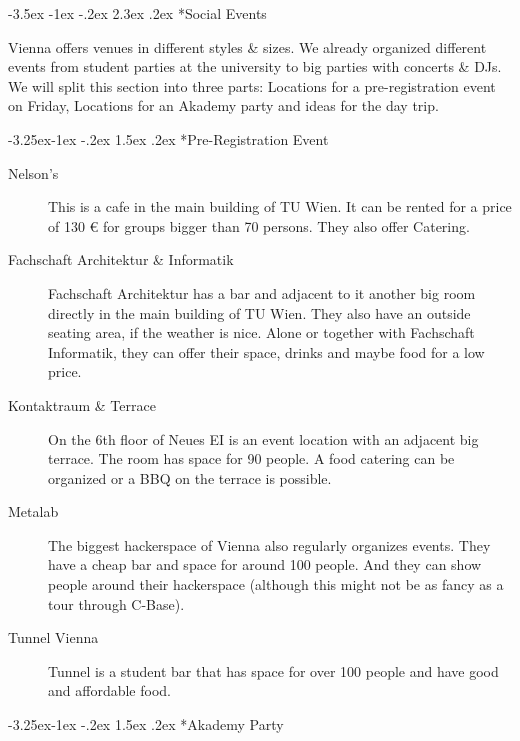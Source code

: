 \documentclass[10pt,a4paper]{article}
\makeatletter
\renewcommand\section{%
\@startsection{section}{1}{\z@}%
              {-3.5ex \@plus -1ex \@minus -.2ex}%
              {2.3ex \@plus.2ex}%
              {\color{kdelight}\sffamily\LARGE\bfseries}}
\renewcommand\subsection{%
\@startsection{subsection}{2}{\z@}%
              {-3.25ex\@plus -1ex \@minus -.2ex}%
              {1.5ex \@plus .2ex}%
              {\color{kdelight}\sffamily\Large\bfseries}}
\makeatother
\begin{document}
\newpage

\section*{Social Events}
Vienna offers venues in different styles \& sizes. We already organized different events from student parties at the university to big parties with concerts \& DJs.
We will split this section into three parts: Locations for a pre-registration event on Friday, Locations for an Akademy party and ideas for the day trip.


\subsection*{Pre-Registration Event}

\begin{description}
\item[\color{kdedarker} Nelson's] This is a cafe in the main building of TU Wien. It can be rented for a price of 130 \euro{} for groups bigger than 70 persons. They also offer Catering.
\item[\color{kdedarker} Fachschaft Architektur \& Informatik] Fachschaft Architektur has a bar and adjacent to it another big room directly in the main building of TU Wien. They also have an outside seating area, if the weather is nice. Alone or together with Fachschaft Informatik, they can offer their space, drinks and maybe food for a low price.
\item[\color{kdedarker} Kontaktraum \& Terrace] On the 6th floor of Neues EI is an event location with an adjacent big terrace. The room has space for 90 people. A food catering can be organized or a BBQ on the terrace is possible.
\item[\color{kdedarker} Metalab] The biggest hackerspace of Vienna also regularly organizes events. They have a cheap bar and space for around 100 people. And they can show people around their hackerspace (although this might not be as fancy as a tour through C-Base).
\item[\color{kdedarker} Tunnel Vienna] Tunnel is a student bar that has space for over 100 people and have good and affordable food.
\end{description}

\subsection*{Akademy Party}
\end{document}
